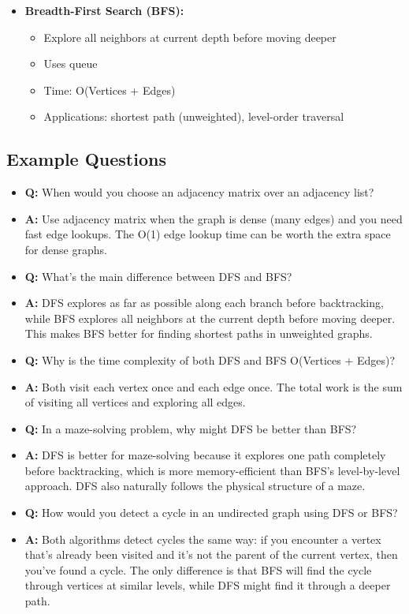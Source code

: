 \documentclass[11pt,a4paper]{article}
\begin{document}
\begin{multicols}{2}
\begin{itemize}
    \item \textbf{Breadth-First Search (BFS):}
    \begin{itemize}
        \item Explore all neighbors at current depth before moving deeper
        \item Uses queue
        \item Time: O(Vertices + Edges)
        \item Applications: shortest path (unweighted), level-order traversal
    \end{itemize}
\end{itemize}

\subsection{Example Questions}
\begin{itemize}
    \item \textbf{Q:} When would you choose an adjacency matrix over an adjacency list?
    \item \textbf{A:} Use adjacency matrix when the graph is dense (many edges) and you need fast edge lookups. The O(1) edge lookup time can be worth the extra space for dense graphs.

    \item \textbf{Q:} What's the main difference between DFS and BFS?
    \item \textbf{A:} DFS explores as far as possible along each branch before backtracking, while BFS explores all neighbors at the current depth before moving deeper. This makes BFS better for finding shortest paths in unweighted graphs.

    \item \textbf{Q:} Why is the time complexity of both DFS and BFS O(Vertices + Edges)?
    \item \textbf{A:} Both visit each vertex once and each edge once. The total work is the sum of visiting all vertices and exploring all edges.
    
    \item \textbf{Q:} In a maze-solving problem, why might DFS be better than BFS?
    \item \textbf{A:} DFS is better for maze-solving because it explores one path completely before backtracking, which is more memory-efficient than BFS's level-by-level approach. DFS also naturally follows the physical structure of a maze.

    \item \textbf{Q:} How would you detect a cycle in an undirected graph using DFS or BFS?
    \item \textbf{A:} Both algorithms detect cycles the same way: if you encounter a vertex that's already been visited and it's not the parent of the current vertex, then you've found a cycle. The only difference is that BFS will find the cycle through vertices at similar levels, while DFS might find it through a deeper path.


\end{itemize}
\end{multicols}
\end{document}
